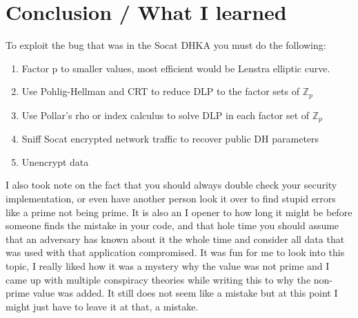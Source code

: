 \documentclass[letterpaper,11pt,notitlepage,fleqn]{article}
\begin{document}
\section{Conclusion / What I learned}
\noindent To exploit the bug that was in the Socat DHKA you must do the following:
\begin{enumerate}
    \item Factor p to smaller values, most efficient would be Lenstra elliptic curve.
    \item Use Pohlig-Hellman and CRT to reduce DLP to the factor sets of $\mathbb{Z}_{p}$
    \item Use Pollar's rho or index calculus to solve DLP in each factor set of $\mathbb{Z}_{p}$
    \item Sniff Socat encrypted network traffic to recover public DH parameters
    \item Unencrypt data
\end{enumerate}
\indent I also took note on the fact that you should always double check your security implementation, or even have another person look it over to find stupid errors like a prime not being prime. It is also an I opener to how long it might be before someone finds the mistake in your code, and that hole time you should assume that an adversary has known about it the whole time and consider all data that was used with that application compromised.  It was fun for me to look into
this topic, I really liked how it was a mystery why the value was not prime and I came up with multiple conspiracy theories while writing this to why the non-prime value was added. It still does not seem like a mistake but at this point I might just have to leave it at that, a mistake.

\medskip
 


\end{document}
